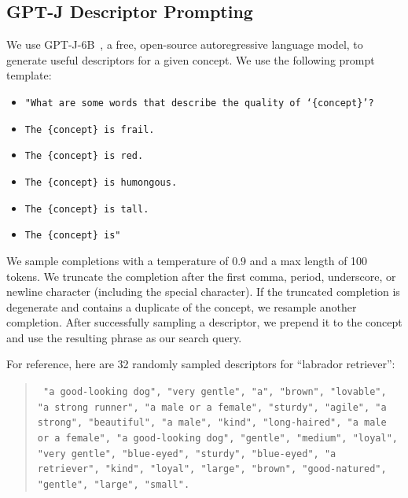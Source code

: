 \subsection{GPT-J Descriptor Prompting}
\label{sec:gptj-descriptors}
We use GPT-J-6B~\cite{gpt-j}, a free, open-source autoregressive language model, to generate useful descriptors for a given concept. We use the following prompt template: 
\begin{itemize}
    \item[] \texttt{"What are some words that describe the quality of `\{concept\}'?} 
    \item[] \texttt{The \{concept\} is frail.}
    \item[] \texttt{The \{concept\} is red.}
    \item[] \texttt{The \{concept\} is humongous.}
    \item[] \texttt{The \{concept\} is tall.}
    \item[] \texttt{The \{concept\} is"}
\end{itemize}

We sample completions with a temperature of 0.9 and a max length of 100 tokens. We truncate the completion after the first comma, period, underscore, or newline character (including the special character). If the truncated completion is degenerate and contains a duplicate of the concept, we resample another completion. After successfully sampling a descriptor, we prepend it to the concept and use the resulting phrase as our search query. 


For reference, here are 32 randomly sampled descriptors for ``labrador retriever'':
\begin{quote}
{\tt { 
"a good-looking dog",
"very gentle",
"a",
"brown",
"lovable",
"a strong runner",
"a male or a female",
"sturdy",
"agile",
"a strong",
"beautiful",
"a male",
"kind",
"long-haired",
"a male or a female",
"a good-looking dog",
"gentle",
"medium",
"loyal",
"very gentle",
"blue-eyed",
"sturdy",
"blue-eyed",
"a retriever",
"kind",
"loyal",
"large",
"brown",
"good-natured",
"gentle",
"large",
"small".
}}
\end{quote}



